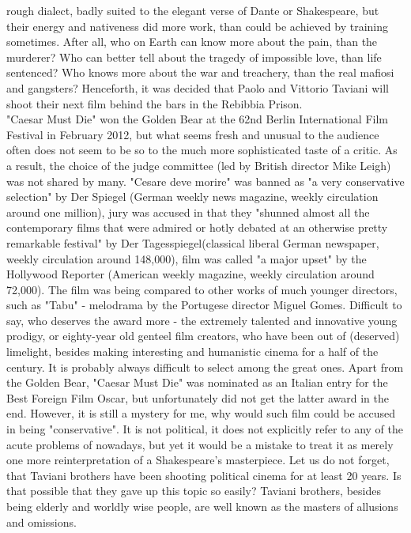 \documentclass[10pt]{article}
\begin{document}
rough dialect, badly suited to the elegant verse of Dante or Shakespeare, but their energy and nativeness did more work, than could be achieved by training sometimes. After all,
who on Earth can know more about the pain, than the murderer? Who can better tell about the tragedy of impossible love, than life sentenced? Who knows more about the war and treachery, than the real mafiosi and gangsters? 
Henceforth, it was decided that Paolo and Vittorio Taviani will shoot their next film behind the bars in the Rebibbia Prison.\\
"Caesar Must Die" won the Golden Bear at the 62nd Berlin International Film Festival in February 2012, but what seems fresh and unusual to the audience often does not seem to be so to the much more sophisticated taste of a critic.
As a result, the choice of the judge committee (led by British director Mike Leigh) was not shared by many. "Cesare deve morire" was banned as "a very conservative selection" by Der Spiegel (German weekly news magazine, weekly 
circulation around one million), jury was accused in that they "shunned almost all the contemporary films that were admired or hotly debated at an otherwise pretty remarkable festival" by Der Tagesspiegel(classical liberal
German newspaper, weekly circulation around 148,000), film was called "a major upset" by the Hollywood Reporter (American weekly magazine, weekly circulation around 72,000). The film was being compared to other works of much younger
directors, such as "Tabu" - melodrama by the Portugese director Miguel Gomes. Difficult to say, who deserves the award more - the extremely talented and innovative young prodigy, or eighty-year old genteel film creators, who have been
out of (deserved) limelight, besides making interesting and humanistic cinema for a half of the century. It is probably always difficult to select among the great ones. Apart from the Golden Bear, "Caesar Must Die" was nominated as
an Italian entry for the Best Foreign Film Oscar, but unfortunately did not get the latter award in the end. However, it is still a mystery for me, why would such film could be accused in being "conservative". It is not political,
it does not explicitly refer to any of the acute problems of nowadays, but yet it would be a mistake to treat it as merely one more reinterpretation of a Shakespeare's masterpiece. Let us do not forget, that Taviani brothers have been
shooting political cinema for at least 20 years. Is that possible that they gave up this topic so easily? Taviani brothers, besides being elderly and worldly wise people, are well known as the masters of allusions and omissions.
\end{document}
